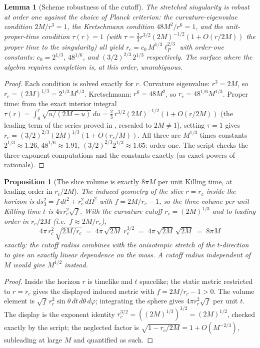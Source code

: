 \documentclass[11pt]{article}
\newtheorem{proposition}[theorem]{Proposition}
\newtheorem{lemma}[theorem]{Lemma}
\theoremstyle{definition}
\newcommand{\lP}{\ell_{P}}
\begin{document}
\begin{lemma}[Scheme robustness of the cutoff]\label{lem:scheme}
The stretched singularity is robust at order one against the choice of Planck criterion: the curvature-eigenvalue condition $2M/r^3 = 1$, the Kretschmann condition $48M^2/r^6 = 1$, and the unit-proper-time condition $\tau(r) = 1$ (with $\tau = \tfrac23 r^{3/2}(2M)^{-1/2}(1 + O(r/2M))$ the proper time to the singularity) all yield $r_c = c_0\,M^{1/3}\lP^{2/3}$ with order-one constants: $c_0 = 2^{1/3}$, $48^{1/6}$, and $(3/2)^{2/3}\,2^{1/3}$ respectively. The surface where the algebra requires completion is, at this order, unambiguous.
\end{lemma}

\begin{proof}
Each condition is solved exactly for $r$. Curvature eigenvalue: $r^3 = 2M$, so $r_c = (2M)^{1/3} = 2^{1/3}M^{1/3}$. Kretschmann: $r^6 = 48M^2$, so $r_c = 48^{1/6}M^{1/3}$. Proper time: from the exact interior integral $\tau(r) = \int_0^r \sqrt{u/(2M - u)}\,du = \tfrac{2}{3}\,r^{3/2}(2M)^{-1/2}(1 + O(r/2M))$ (the leading term of the series proved in \cite[Lem.~5.1]{ButlerT6}, rescaled to $2M \neq 1$), setting $\tau = 1$ gives $r_c = (3/2)^{2/3}(2M)^{1/3}(1 + O(r_c/M))$. All three are $M^{1/3}$ times constants $2^{1/3} \approx 1.26$, $48^{1/6} \approx 1.91$, $(3/2)^{2/3}2^{1/3} \approx 1.65$: order one. The script checks the three exponent computations and the constants exactly (as exact powers of rationals).
\end{proof}

\begin{proposition}[The slice volume is exactly $8\pi M$ per unit Killing time, at leading order in $r_c/2M$]\label{prop:volume}
The induced geometry of the slice $r = r_c$ inside the horizon is $ds_3^2 = f\,dt^2 + r_c^2\,d\Omega^2$ with $f = 2M/r_c - 1$, so the three-volume per unit Killing time $t$ is $4\pi r_c^2\sqrt{f}$. With the curvature cutoff $r_c = (2M)^{1/3}$ and to leading order in $r_c/2M$ (i.e.\ $f \approx 2M/r_c$),
\[
4\pi\,r_c^2\,\sqrt{2M/r_c} \;=\; 4\pi\,\sqrt{2M}\;r_c^{3/2} \;=\; 4\pi\,\sqrt{2M}\,\sqrt{2M} \;=\; 8\pi M
\]
\emph{exactly}: the cutoff radius combines with the anisotropic stretch of the $t$-direction to give an exactly linear dependence on the mass. A cutoff radius independent of $M$ would give $M^{1/2}$ instead.
\end{proposition}

\begin{proof}
Inside the horizon $r$ is timelike and $t$ spacelike; the static metric restricted to $r = r_c$ gives the displayed induced metric with $f = 2M/r_c - 1 > 0$. The volume element is $\sqrt{f}\,r_c^2\sin\theta\,dt\,d\theta\,d\varphi$; integrating the sphere gives $4\pi r_c^2\sqrt f$ per unit $t$. The display is the exponent identity $r_c^{3/2} = ((2M)^{1/3})^{3/2} = (2M)^{1/2}$, checked exactly by the script; the neglected factor is $\sqrt{1 - r_c/2M} = 1 + O(M^{-2/3})$, subleading at large $M$ and quantified as such.
\end{proof}
\end{document}
